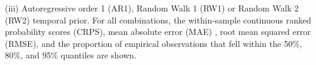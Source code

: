 \documentclass{article}
\begin{document}
\begin{landscape}
{\begin{table}[H]
{             (iii) Autoregressive order 1 (AR1), Random Walk 1 (RW1) or 
             Random Walk 2 (RW2) temporal prior. 
             For all combinations, the within-sample continuous ranked 
             probability scores (CRPS), mean absolute error (MAE) , 
             root mean squared error (RMSE), and the proportion of empirical 
             observations that fell within the 50\%, 80\%, and 95\% 
             quantiles are shown.} 
  \label{tab::PPC1Non-VMMC} 
\end{table}}
 

\end{landscape}
\end{document}
